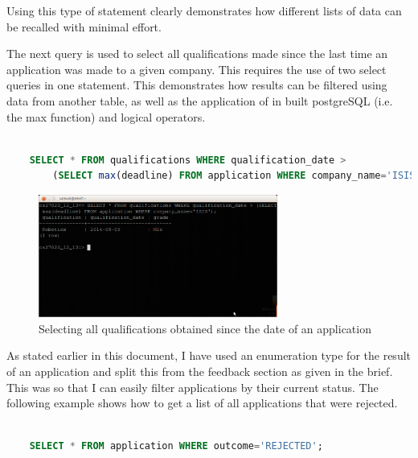 \documentclass{article}
\begin{document}
Using this type of statement clearly demonstrates how different lists of data can be recalled with minimal effort.

The next query is used to select all qualifications made since the last time an application was made to a given company. This requires the use of two select queries in one statement. This demonstrates how results can be filtered using data from another table, as well as the application of in built postgreSQL (i.e. the max function) and logical operators.

\begin{center}
	\begin{lstlisting}[language=sql, showstringspaces=false]

	SELECT * FROM qualifications WHERE qualification_date > 
		(SELECT max(deadline) FROM application WHERE company_name='ISIS');

	\end{lstlisting}
\end{center}

\begin{figure}[H]
\centering
\includegraphics[width=0.7\textwidth]{img/test/test-date.png}
\caption{Selecting all qualifications obtained since the date of an application}
\label{fig:test-date}
\end{figure}

As stated earlier in this document, I have used an enumeration type for the result of an application and split this from the feedback section as given in the brief. This was so that I can easily filter applications by their current status. The following example shows how to get a list of all applications that were rejected.

\begin{center}
	\begin{lstlisting}[language=sql, showstringspaces=false]

	SELECT * FROM application WHERE outcome='REJECTED';

	\end{lstlisting}
\end{center}
\end{document}
